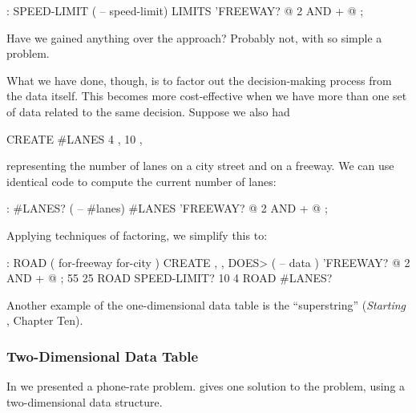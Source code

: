 \begin{Code}
: SPEED-LIMIT  ( -- speed-limit)
     LIMITS  'FREEWAY? @  2 AND  +  @ ;
\end{Code}
Have we gained anything over the  approach?
Probably not, with so simple a problem.

What we have done, though, is to factor out the decision-making
process from the data itself. This becomes more cost-effective when we
have more than one set of data related to the same decision. Suppose we
also had

\begin{Code}
CREATE #LANES   4 ,  10 ,
\end{Code}
representing the number of lanes on a city street and on a freeway. We
can use identical code to compute the current number of lanes:

\begin{Code}
: #LANES?  ( -- #lanes)
     #LANES  'FREEWAY? @  2 AND  +  @ ;
\end{Code}
Applying techniques of factoring, we simplify this to:

\begin{Code}
: ROAD  ( for-freeway for-city ) CREATE , ,
     DOES> ( -- data )  'FREEWAY? @  2 AND  +  @ ;
55 25 ROAD SPEED-LIMIT?
10  4 ROAD #LANES?
\end{Code}
Another example of the one-dimensional data table is the ``superstring''
(\emph{Starting \Forth{}}, Chapter Ten).

\subsubsection{Two-Dimensional Data Table}%
%
In  we presented a phone-rate problem.  gives one
solution to the problem, using a two-dimensional data structure.

